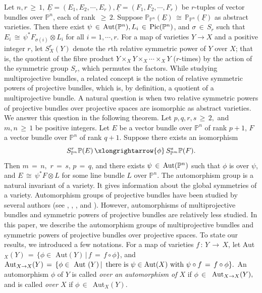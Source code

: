 \documentclass[12pt,reqno]{amsart}
\newenvironment{manualtheorem}[1]{%
\renewcommand\themanualtheoreminner{#1}%
  \manualtheoreminner
}{\endmanualtheoreminner}
\theoremstyle{definition}
\numberwithin{equation}{section}
\begin{document}
\begin{manualtheorem}{A}\label{A}
Let $n,r \,\geq\, 1$, $\underline{E}=(E_1, E_2,\cdots, E_r), \underline{F}=(F_1, F_2,\cdots, F_r)$ be $r$-tuples of vector bundles over $\mathbb{P}^n$, each of rank $\,\geq\, 2$. Suppose $\mathbb{P}_{\mathbb{P}^n}(\underline{E}) \,\cong\, \mathbb{P}_{\mathbb{P}^n}(\underline{F})$ as abstract varieties. Then there exist $\psi \,\in\, \textnormal{Aut}(\mathbb{P}^n), L_{i } \,\in\, \textnormal{Pic}(\mathbb{P}^n) $, and $ \sigma \,\in\, S_{r}$ such that $ E_{i} \,\cong\, \psi^{\ast}F_{\sigma(i)} \otimes L_{i}$ for all $i = 1,\cdots,r$.
\end{manualtheorem}
For a map of varieties $Y\to X$ and a positive integer $r$, let $S^r_X(Y)$ denote the $r$th relative symmetric power of $Y$ over $X$; that is, the quotient of the fibre product $ Y \times_{X} Y \times_{X}\cdots\times_{X }Y$ ($r$-times) by the action of the symmetric group $S_r$, which permutes the factors. While studying multiprojective bundles, a related concept is the notion of relative symmetric powers of projective bundles, which is, by definition, a quotient of a multiprojective bundle. A natural question is when two relative symmetric powers of projective bundles over projective spaces are isomorphic as abstract varieties. We answer this question in the following theorem. 
\begin{manualtheorem}{B}\label{sym}
Let $ p,q,r,s \,\geq\, 2,$ and $m,n \,\geq\, 1$
 be positive integers. Let $E$ be a vector bundle over $ \mathbb{P}^n$  of rank $p+1$, $F$ a vector bundle over $ \mathbb{P}^n$ of rank $ q+1$. Suppose there exists an isomorphism
 $$ S_{\mathbb{P}^n}^{r}\mathbb{P}(E)\,\xlongrightarrow{\phi}\, S_{\mathbb{P}^m}^s\mathbb{P}(F).$$ 
 Then $m\,=\,n,$ $r\,=\,s$, $ p\,=\,q$, and there exists $\psi \,\in\, \textnormal{Aut}(\mathbb{P}^n)$ such that $ \phi$ is over $ \psi$, and $ E \,\cong\, \psi^{\ast}F \otimes L$ for some line bundle $L$ over $\mathbb{P}^n.$
 \end{manualtheorem}
The automorphism group is a natural invariant of a variety. It gives information about the global symmetries of a variety. Automorphism groups of projective bundles have been studied by several authors  (see \cite{BFT}, \cite{Fa}, \cite{Fo}, \cite{Ko} and \cite{Ma}). However, automorphisms of multiprojective bundles and symmetric powers of projective bundles are relatively less studied. In this paper, we describe the automorphism groups of multiprojective bundles and symmetric powers of projective bundles over projective spaces. To state our results, we introduced a few notations. For a map of varieties $f\,:\,Y\,\to\, X$, let Aut$_X(Y)\,=\,\{\phi\in\text{ Aut}(Y)\,|\, f\,=\,f\circ\phi\}$, and $\textnormal{Aut}_{X\to X}(Y)\,=\,\{\phi\in\text{ Aut }(Y)\,|\,\text{ there is } \psi\in \text{Aut}(X) \text{ with } \psi\circ f\,=\,f\circ\phi\}.$  An automorphism $\phi$ of $Y$ is called \textit{over an automorphism of $X$} if $\phi\, \in\,$ $\textnormal{Aut}_{X\to X}(Y),$ and is called \textit{over $X$} if $\phi\, \in\,$ Aut$_X(Y)$. 
\end{document}
